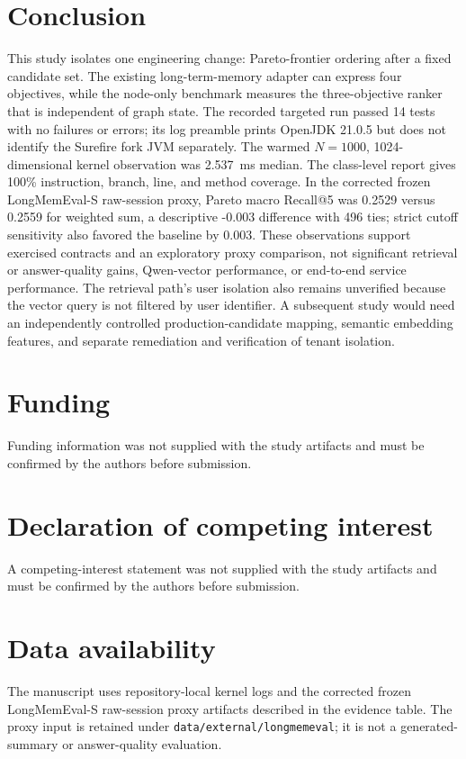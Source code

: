 \documentclass[review,12pt]{elsarticle}
\begin{document}
\section{Conclusion}
\label{sec:conclusion}

This study isolates one engineering change: Pareto-frontier ordering after a fixed candidate set. The existing long-term-memory adapter can express four objectives, while the node-only benchmark measures the three-objective ranker that is independent of graph state. The recorded targeted run passed 14 tests with no failures or errors; its log preamble prints OpenJDK 21.0.5 but does not identify the Surefire fork JVM separately. The warmed $N=1000$, 1024-dimensional kernel observation was 2.537~ms median. The class-level report gives 100\% instruction, branch, line, and method coverage. In the corrected frozen LongMemEval-S raw-session proxy, Pareto macro Recall@5 was 0.2529 versus 0.2559 for weighted sum, a descriptive -0.003 difference with 496 ties; strict cutoff sensitivity also favored the baseline by 0.003. These observations support exercised contracts and an exploratory proxy comparison, not significant retrieval or answer-quality gains, Qwen-vector performance, or end-to-end service performance. The retrieval path's user isolation also remains unverified because the vector query is not filtered by user identifier. A subsequent study would need an independently controlled production-candidate mapping, semantic embedding features, and separate remediation and verification of tenant isolation.

\section*{Funding}
Funding information was not supplied with the study artifacts and must be confirmed by the authors before submission.

\section*{Declaration of competing interest}
A competing-interest statement was not supplied with the study artifacts and must be confirmed by the authors before submission.

\section*{Data availability}
The manuscript uses repository-local kernel logs and the corrected frozen LongMemEval-S raw-session proxy artifacts described in the evidence table. The proxy input is retained under \texttt{data/external/longmemeval}; it is not a generated-summary or answer-quality evaluation.
\end{document}
